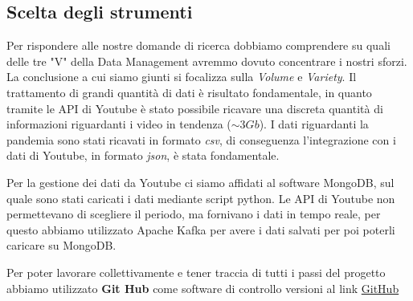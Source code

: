 \subsection*{Scelta degli strumenti}
Per rispondere alle nostre domande di ricerca dobbiamo comprendere su quali delle tre "V" della Data Management avremmo dovuto concentrare i nostri sforzi. La conclusione a cui siamo giunti si focalizza sulla \textit{Volume} e \textit{Variety}. Il trattamento di grandi quantità di dati è risultato fondamentale, in quanto tramite le API di Youtube è stato possibile ricavare una discreta quantità di informazioni riguardanti i video in tendenza ($\sim 3Gb$). I dati riguardanti la pandemia sono stati ricavati in formato \textit{csv}, di conseguenza l'integrazione con i dati di Youtube, in formato \textit{json}, è stata fondamentale.

Per la gestione dei dati da Youtube ci siamo affidati al software MongoDB, sul quale sono stati caricati i dati mediante script python. Le API di Youtube non permettevano di scegliere il periodo, ma fornivano i dati in tempo reale, per questo abbiamo utilizzato Apache Kafka per avere i dati salvati per poi poterli caricare su MongoDB.
 
Per poter lavorare collettivamente e tener traccia di tutti i passi del progetto abbiamo utilizzato \textbf{Git Hub} come software di controllo versioni al link \href{https://github.com/fedelux3/Youtube_trending_analysis}{GitHub} 
